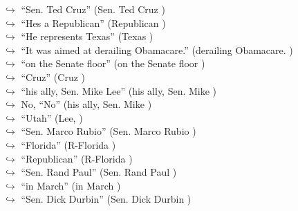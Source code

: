 \documentclass[11pt,a4paper, onecolumn]{article}
\begin{document}
\begin{figure}[t] \small \begin{tcolorbox}[boxsep=0pt,left=5pt,right=0pt,top=2pt,colback = yellow!5] \begin{dialogue}
 \small 
\colorbox{pink!25}{$\hookrightarrow$}
{ ``Sen. Ted Cruz'' (Sen. Ted Cruz ) }
\\
\colorbox{pink!25}{$\hookrightarrow$}
{ ``Hes a Republican'' (Republican ) }
\\
\colorbox{pink!25}{$\hookrightarrow$}
{ ``He represents Texas'' (Texas ) }
\\
\colorbox{pink!25}{$\hookrightarrow$}
{ ``It was aimed at derailing Obamacare.'' (derailing Obamacare. ) }
\\
\colorbox{pink!25}{$\hookrightarrow$}
{ ``on the Senate floor'' (on the Senate floor ) }
\\
\colorbox{pink!25}{$\hookrightarrow$}
{ ``Cruz'' (Cruz ) }
\\
\colorbox{pink!25}{$\hookrightarrow$}
{ ``his ally, Sen. Mike Lee'' (his ally, Sen. Mike ) }
\\
\colorbox{pink!25}{$\hookrightarrow$}
\colorbox{red!25}{No,}
{ ``No'' (his ally, Sen. Mike ) }
\\
\colorbox{pink!25}{$\hookrightarrow$}
{ ``Utah'' (Lee, ) }
\\
\colorbox{pink!25}{$\hookrightarrow$}
{ ``Sen. Marco Rubio'' (Sen. Marco Rubio ) }
\\
\colorbox{pink!25}{$\hookrightarrow$}
{ ``Florida'' (R-Florida ) }
\\
\colorbox{pink!25}{$\hookrightarrow$}
{ ``Republican'' (R-Florida ) }
\\
\colorbox{pink!25}{$\hookrightarrow$}
{ ``Sen. Rand Paul'' (Sen. Rand Paul ) }
\\
\colorbox{pink!25}{$\hookrightarrow$}
{ ``in March'' (in March ) }
\\
\colorbox{pink!25}{$\hookrightarrow$}
{ ``Sen. Dick Durbin'' (Sen. Dick Durbin ) }
\\
 \end{dialogue}\end{tcolorbox}\end{figure}
\end{document}
